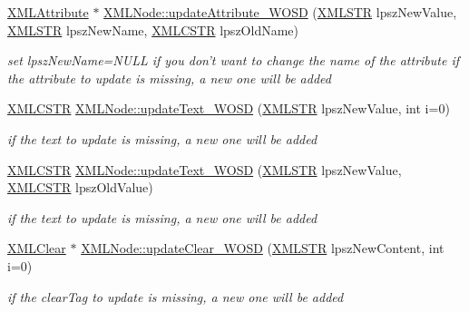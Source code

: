 \begin{DoxyCompactItemize}
\hyperlink{structXMLAttribute}{X\-M\-L\-Attribute} $\ast$ \hyperlink{group__xmlWOSD_gababf6cef26796c45b88eb5772a9cafc4}{X\-M\-L\-Node\-::update\-Attribute\-\_\-\-W\-O\-S\-D} (\hyperlink{xmlParser_8h_a849d96105aa0c8f64b5c10d9151a3cdc}{X\-M\-L\-S\-T\-R} lpsz\-New\-Value, \hyperlink{xmlParser_8h_a849d96105aa0c8f64b5c10d9151a3cdc}{X\-M\-L\-S\-T\-R} lpsz\-New\-Name, \hyperlink{xmlParser_8h_acdb0d6fd8dd596384b438d86cfb2b182}{X\-M\-L\-C\-S\-T\-R} lpsz\-Old\-Name)
\begin{DoxyCompactList}\small\item\em set lpsz\-New\-Name=N\-U\-L\-L if you don't want to change the name of the attribute if the attribute to update is missing, a new one will be added \end{DoxyCompactList}\item 
\hyperlink{xmlParser_8h_acdb0d6fd8dd596384b438d86cfb2b182}{X\-M\-L\-C\-S\-T\-R} \hyperlink{group__xmlWOSD_ga8809eddad474e8bd7ad5f57aea7c77ac}{X\-M\-L\-Node\-::update\-Text\-\_\-\-W\-O\-S\-D} (\hyperlink{xmlParser_8h_a849d96105aa0c8f64b5c10d9151a3cdc}{X\-M\-L\-S\-T\-R} lpsz\-New\-Value, int i=0)
\begin{DoxyCompactList}\small\item\em if the text to update is missing, a new one will be added \end{DoxyCompactList}\item 
\hyperlink{xmlParser_8h_acdb0d6fd8dd596384b438d86cfb2b182}{X\-M\-L\-C\-S\-T\-R} \hyperlink{group__xmlWOSD_gae2c448a74bf74bcd502d4ba27c63eabc}{X\-M\-L\-Node\-::update\-Text\-\_\-\-W\-O\-S\-D} (\hyperlink{xmlParser_8h_a849d96105aa0c8f64b5c10d9151a3cdc}{X\-M\-L\-S\-T\-R} lpsz\-New\-Value, \hyperlink{xmlParser_8h_acdb0d6fd8dd596384b438d86cfb2b182}{X\-M\-L\-C\-S\-T\-R} lpsz\-Old\-Value)
\begin{DoxyCompactList}\small\item\em if the text to update is missing, a new one will be added \end{DoxyCompactList}\item 
\hyperlink{structXMLClear}{X\-M\-L\-Clear} $\ast$ \hyperlink{group__xmlWOSD_gac977a2e6b885ff4df3895deca771c363}{X\-M\-L\-Node\-::update\-Clear\-\_\-\-W\-O\-S\-D} (\hyperlink{xmlParser_8h_a849d96105aa0c8f64b5c10d9151a3cdc}{X\-M\-L\-S\-T\-R} lpsz\-New\-Content, int i=0)
\begin{DoxyCompactList}\small\item\em if the clear\-Tag to update is missing, a new one will be added \end{DoxyCompactList}\item 

\end{DoxyCompactItemize}
